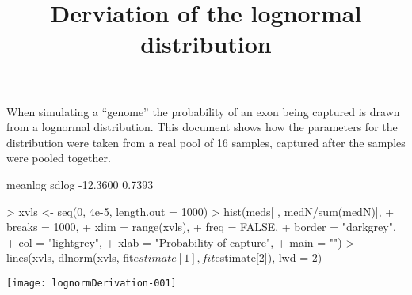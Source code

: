 \documentclass{article}
\begin{document}


\title{Derviation of the lognormal distribution}
\maketitle

When simulating a ``genome'' the probability of an exon being captured is drawn from a lognormal distribution. This document shows how the parameters for the distribution were taken from a real pool of 16 samples, captured after the samples were pooled together.

\begin{Schunk}
\begin{Soutput}
 meanlog    sdlog 
-12.3600   0.7393 
\end{Soutput}
\begin{Sinput}
> xvls <- seq(0, 4e-5, length.out = 1000)
> hist(meds[ , medN/sum(medN)],
+      breaks = 1000,
+      xlim = range(xvls),
+      freq = FALSE,
+      border = "darkgrey",
+      col = "lightgrey",
+      xlab = "Probability of capture",
+      main = "")
> lines(xvls, dlnorm(xvls, fit$estimate[1], fit$estimate[2]), lwd = 2)
\end{Sinput}
\end{Schunk}
\texttt{[image: lognormDerivation-001]}
\end{document}
